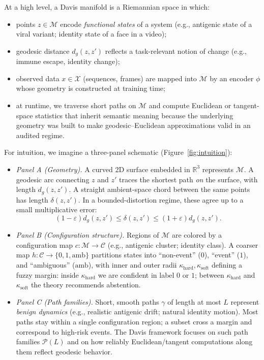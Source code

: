 \documentclass[11pt]{article}
\theoremstyle{remark}
\theoremstyle{plain}
\begin{document}
At a high level, a Davis manifold is a Riemannian space in which:
\begin{itemize}
    \item points $z \in \mathcal{M}$ encode \emph{functional states} of a system (e.g., antigenic
    state of a viral variant; identity state of a face in a video);
    \item geodesic distance $d_g(z,z')$ reflects a task-relevant notion of change
    (e.g., immune escape, identity change);
    \item observed data $x \in \mathcal{X}$ (sequences, frames) are mapped into $\mathcal{M}$
    by an encoder $\phi$ whose geometry is constructed at training time;
    \item at runtime, we traverse short paths on $\mathcal{M}$ and compute Euclidean or
    tangent-space statistics that inherit semantic meaning because the underlying geometry
    was built to make geodesic--Euclidean approximations valid in an audited regime.
\end{itemize}

For intuition, we imagine a three-panel schematic (Figure~\ref{fig:intuition}):

\begin{itemize}
    \item \emph{Panel A (Geometry).} A curved 2D surface embedded in $\mathbb{R}^3$ represents
    $\mathcal{M}$. A geodesic arc connecting $z$ and $z'$ traces the shortest path \emph{on}
    the surface, with length $d_g(z,z')$. A straight ambient-space chord between the same
    points has length $\delta(z,z')$. In a bounded-distortion regime, these agree up to a
    small multiplicative error:
    \[
        (1-\varepsilon) d_g(z,z') \le \delta(z,z') \le (1+\varepsilon) d_g(z,z').
    \]

    \item \emph{Panel B (Configuration structure).} Regions of $\mathcal{M}$ are colored
    by a configuration map $c:\mathcal{M} \to \mathcal{C}$ (e.g., antigenic cluster;
    identity class). A coarser map $h:\mathcal{C} \to \{0,1,\mathrm{amb}\}$ partitions
    states into ``non-event'' ($0$), ``event'' ($1$), and ``ambiguous'' ($\mathrm{amb}$),
    with inner and outer radii $\kappa_{\mathrm{hard}},\kappa_{\mathrm{soft}}$ defining
    a fuzzy margin: inside $\kappa_{\mathrm{hard}}$ we are confident in label $0$ or $1$;
    between $\kappa_{\mathrm{hard}}$ and $\kappa_{\mathrm{soft}}$ the theory recommends
    abstention.

    \item \emph{Panel C (Path families).} Short, smooth paths $\gamma$ of length at most
    $L$ represent \emph{benign dynamics} (e.g., realistic antigenic drift; natural identity
    motion). Most paths stay within a single configuration region; a subset cross a margin
    and correspond to high-risk events. The Davis framework focuses on such path families
    $\mathcal{P}(L)$ and on how reliably Euclidean/tangent computations along them reflect
    geodesic behavior.
\end{itemize}
\end{document}
